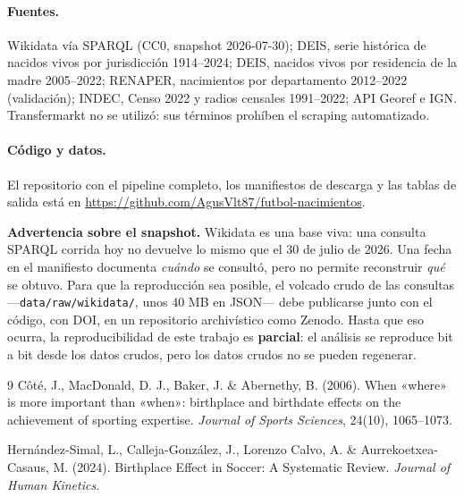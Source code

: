 \documentclass[11pt,a4paper]{article}
\begin{document}
\paragraph{Fuentes.}
Wikidata vía SPARQL (CC0, snapshot 2026-07-30);
DEIS, serie histórica de nacidos vivos por jurisdicción 1914--2024;
DEIS, nacidos vivos por residencia de la madre 2005--2022;
RENAPER, nacimientos por departamento 2012--2022 (validación);
INDEC, Censo 2022 y radios censales 1991--2022;
API Georef e IGN.
Transfermarkt no se utilizó: sus términos prohíben el scraping automatizado.

\paragraph{Código y datos.}
El repositorio con el pipeline completo, los manifiestos de descarga y las
tablas de salida está en
\url{https://github.com/AgusVlt87/futbol-nacimientos}.

\textbf{Advertencia sobre el snapshot.} Wikidata es una base viva: una consulta
SPARQL corrida hoy no devuelve lo mismo que el 30 de julio de 2026. Una fecha en
el manifiesto documenta \emph{cuándo} se consultó, pero no permite reconstruir
\emph{qué} se obtuvo. Para que la reproducción sea posible, el volcado crudo de
las consultas —\texttt{data/raw/wikidata/}, unos 40 MB en JSON— debe publicarse
junto con el código, con DOI, en un repositorio archivístico como Zenodo. Hasta
que eso ocurra, la reproducibilidad de este trabajo es \textbf{parcial}: el
análisis se reproduce bit a bit desde los datos crudos, pero los datos crudos no
se pueden regenerar.

\begin{thebibliography}{9}
\small
{}
Côté, J., MacDonald, D. J., Baker, J. \& Abernethy, B. (2006).
When «where» is more important than «when»: birthplace and birthdate effects on
the achievement of sporting expertise.
\emph{Journal of Sports Sciences}, 24(10), 1065--1073.

Hernández-Simal, L., Calleja-González, J., Lorenzo Calvo, A. \&
Aurrekoetxea-Casaus, M. (2024).
Birthplace Effect in Soccer: A Systematic Review.
\emph{Journal of Human Kinetics}.

\end{thebibliography}
\end{document}
